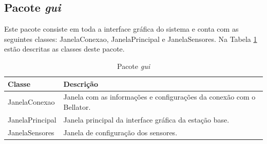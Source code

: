 \subsection{Pacote \textit{gui}}

Este pacote consiste em toda a interface gráfica do sistema e conta com as seguintes classes: JanelaConexao, JanelaPrincipal e JanelaSensores. Na Tabela \ref{tab:pacote_interface_grafica} estão descritas as classes deste pacote.

\begin{table}[h]
  \centering
  \caption{Pacote \textit{gui}}
  \begin{tabular}{p{6cm}p{8cm}}
    \toprule
    \textbf{Classe} & \textbf{Descrição} \\ 
    \midrule
    JanelaConexao & Janela com as informações e configurações da conexão com o Bellator. \\ \hline
    JanelaPrincipal & Janela principal da interface gráfica da estação base. \\ 
    JanelaSensores & Janela de configuração dos sensores. \\ 
    \bottomrule
  \end{tabular}%
  \label{tab:pacote_interface_grafica}%
\end{table}%

